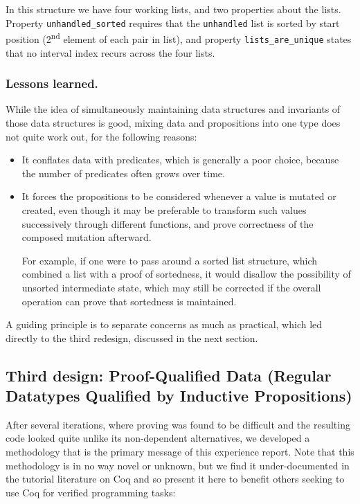 \documentclass{llncs}
\begin{document}
In this structure we have four working lists, and two properties about
the lists. Property \texttt{unhandled\_sorted} requires that the
\texttt{unhandled} list is sorted by start position
(2\textsuperscript{nd} element of each pair in list), and property
\texttt{lists\_are\_unique} states that no interval index recurs
across the four lists.

\subsubsection*{Lessons learned.}

While the idea of simultaneously maintaining data structures and
invariants of those data structures is good, mixing data and
propositions into one type does not quite work out, for the following
reasons: 

\begin{itemize}
\item It conflates data with predicates, which is generally a poor choice,
  because the number of predicates often grows over time.

\item It forces the propositions to be considered whenever a value is mutated
  or created, even though it may be preferable to transform such values
  successively through different functions, and prove correctness of the
  composed mutation afterward.

  For example, if one were to pass around a sorted list structure, which
  combined a list with a proof of sortedness, it would disallow the
  possibility of unsorted intermediate state, which may still be corrected if
  the overall operation can prove that sortedness is maintained.
\end{itemize}

A guiding principle is to separate concerns as much as practical, which led
directly to the third redesign, discussed in the next section.  

\subsection{Third design: Proof-Qualified Data (Regular Datatypes Qualified by
  Inductive Propositions)}
\label{sec:splitdesign}

After several iterations, where proving was found to be difficult and the
resulting code looked quite unlike its non-dependent alternatives, we
developed a methodology that is the primary message of this experience report.
Note that this methodology is in no way novel or unknown, but we find it
under-documented in the tutorial literature on Coq and so present it here to
benefit others seeking to use Coq for verified programming tasks:
\end{document}
